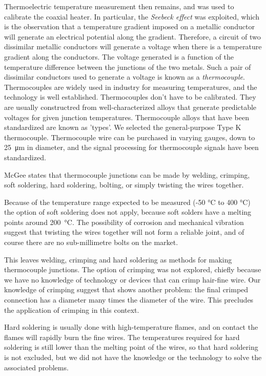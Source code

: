 Thermoelectric temperature measurement then remains, and was used to calibrate
the coaxial heater. In particular, the \textit{Seebeck effect} was exploited,
which is the observation that a temperature gradient imposed on a metallic
conductor will generate an electrical potential along the gradient. Therefore, a
circuit of two dissimilar metallic conductors will generate a voltage when there
is a temperature gradient along the conductors. The voltage generated is a
function of the temperature difference between the junctions of the two metals.
Such a pair of dissimilar conductors used to generate a voltage is known as a
\textit{thermocouple}. Thermocouples are widely used in industry for measuring
temperatures, and the technology is well established. Thermocouples don't have
to be calibrated. They are usually constructred from well-characterized alloys
that generate predictable voltages for given junction temperatures. Thermocouple
alloys that have been standardized are known as 'types'. We selected the
general-purpose Type K thermocouple. Thermocouple wire can be purchased in
varying gauges, down to \SI{25}{\micro\metre} in diameter, and the signal
processing for thermocouple signals have been standardized.

McGee \autocite{McGee1988} states that thermocouple junctions can be made by
welding, crimping, soft soldering, hard soldering, bolting, or simply twisting
the wires together.

Because of the temperature range expected to be measured ({-}50 \si{\celsius} to
400 \si{\celsius}) the option of soft soldering does not apply, because soft
solders have a melting points around \SI{200}{\celsius}. The possibility of
corrosion and mechanical vibration suggest that twisting the wires together
will not form a reliable joint, and of course there are no sub-millimetre bolts
on the market.

This leaves welding, crimping and hard soldering as methods for making
thermocouple junctions. The option of crimping was not explored, chiefly because
we have no knowledge of technology or devices that can crimp hair-fine wire. Our
knowledge of crimping suggest that shows another problem: the final crimped
connection has a diameter many times the diameter of the wire. This precludes
the application of crimping in this context.

Hard soldering is usually done with high-temperature flames, and on contact the
flames will rapidly burn the fine wires. The temperatures required for hard
soldering is still lower than the melting point of the wires, so that hard
soldering is not excluded, but we did not have the knowledge or the technology
to solve the associated problems.

